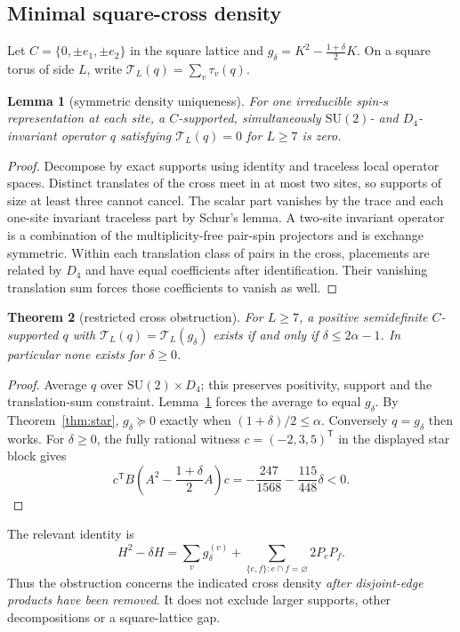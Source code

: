 \documentclass[11pt,a4paper]{article}
\newtheorem{theorem}{Theorem}[section]
\newtheorem{lemma}[theorem]{Lemma}\newtheorem{proposition}[theorem]{Proposition}
\theoremstyle{remark}\newtheorem{remark}[theorem]{Remark}
\begin{document}
\subsection{Minimal square-cross density}
Let $C=\{0,\pm e_1,\pm e_2\}$ in the square lattice and $g_\delta=K^2-\tfrac{1+\delta}{2}K$. On a square torus of side $L$, write $\mathcal T_L(q)=\sum_v\tau_v(q)$.
\begin{lemma}[symmetric density uniqueness]\label{lem:crosskernel}
For one irreducible spin-$s$ representation at each site, a $C$-supported, simultaneously $\mathrm{SU}(2)$- and $D_4$-invariant operator $q$ satisfying $\mathcal T_L(q)=0$ for $L\ge7$ is zero.
\end{lemma}
\begin{proof}
Decompose by exact supports using identity and traceless local operator spaces. Distinct translates of the cross meet in at most two sites, so supports of size at least three cannot cancel. The scalar part vanishes by the trace and each one-site invariant traceless part by Schur's lemma. A two-site invariant operator is a combination of the multiplicity-free pair-spin projectors and is exchange symmetric. Within each translation class of pairs in the cross, placements are related by $D_4$ and have equal coefficients after identification. Their vanishing translation sum forces those coefficients to vanish as well.
\end{proof}
\begin{theorem}[restricted cross obstruction]\label{thm:cross}
For $L\ge7$, a positive semidefinite $C$-supported $q$ with $\mathcal T_L(q)=\mathcal T_L(g_\delta)$ exists if and only if $\delta\le2\alpha-1$. In particular none exists for $\delta\ge0$.
\end{theorem}
\begin{proof}
Average $q$ over $\mathrm{SU}(2)\times D_4$; this preserves positivity, support and the translation-sum constraint. Lemma~\ref{lem:crosskernel} forces the average to equal $g_\delta$. By Theorem~\ref{thm:star}, $g_\delta\succeq0$ exactly when $(1+\delta)/2\le\alpha$. Conversely $q=g_\delta$ then works. For $\delta\ge0$, the fully rational witness $c=(-2,3,5)^{\mathsf T}$ in the displayed star block gives
\[
 c^{\mathsf T}B\left(A^2-\frac{1+\delta}{2}A\right)c
 =-\frac{247}{1568}-\frac{115}{448}\delta<0.
\]
\end{proof}
The relevant identity is
\[
 H^2-\delta H=\sum_v g_\delta^{(v)}+
 \sum_{\{e,f\}:e\cap f=\varnothing}2P_eP_f.
\]
Thus the obstruction concerns the indicated cross density \emph{after disjoint-edge products have been removed}. It does not exclude larger supports, other decompositions or a square-lattice gap.
\end{document}

